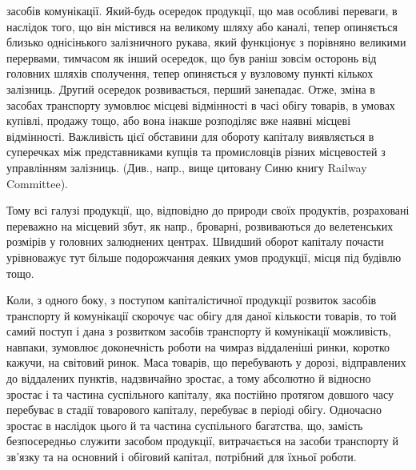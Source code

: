 \parcont{}  %
засобів комунікації. Який-будь осередок продукції, що мав особливі переваги,
в наслідок того, що він містився на великому шляху або каналі,
тепер опиняється близько однісінького залізничного рукава, який функціонує
з порівняно великими перервами, тимчасом як інший осередок,
що був раніш зовсім осторонь від головних шляхів сполучення, тепер
опиняється у вузловому пункті кількох залізниць. Другий осередок розвивається,
перший занепадає. Отже, зміна в засобах транспорту зумовлює
місцеві відмінності в часі обігу товарів, в умовах купівлі, продажу
тощо, або вона інакше розподіляє вже наявні місцеві відмінності. Важливість
цієї обставини для обороту капіталу виявляється в суперечках між
представниками купців та промисловців різних місцевостей з управлінням
залізниць. (Див., напр., вище цитовану Синю книгу Railway Committee).

Тому всі галузі продукції, що, відповідно до природи своїх продуктів,
розраховані переважно на місцевий збут, як напр., броварні, розвиваються
до велетенських розмірів у головних залюднених центрах.
Швидший оборот капіталу почасти урівноважує тут більше подорожчання
деяких умов продукції, місця під будівлю тощо.

Коли, з одного боку, з поступом капіталістичної продукції розвиток
засобів транспорту й комунікації скорочує час обігу для даної кількости
товарів, то той самий поступ і дана з розвитком засобів транспорту
й комунікації можливість, навпаки, зумовлює доконечність роботи
на чимраз віддаленіші ринки, коротко кажучи, на світовий ринок. Маса
товарів, що перебувають у дорозі, відправлених до віддалених пунктів,
надзвичайно зростає, а тому абсолютно й відносно зростає і та частина
суспільного капіталу, яка постійно протягом довшого часу перебуває в
стадії товарового капіталу, перебуває в періоді обігу. Одночасно зростає
в наслідок цього й та частина суспільного багатства, що, замість безпосередньо
служити засобом продукції, витрачається на засоби транспорту
й зв’язку та на основний і обіговий капітал, потрібний для їхньої
роботи.

